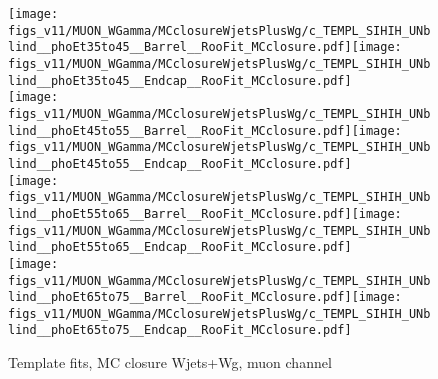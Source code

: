 \begin{figure}[htb]
  \begin{center}
   \texttt{[image: figs\_v11/MUON\_WGamma/MCclosureWjetsPlusWg/c\_TEMPL\_SIHIH\_UNblind\_\_phoEt35to45\_\_Barrel\_\_RooFit\_MCclosure.pdf]}\texttt{[image: figs\_v11/MUON\_WGamma/MCclosureWjetsPlusWg/c\_TEMPL\_SIHIH\_UNblind\_\_phoEt35to45\_\_Endcap\_\_RooFit\_MCclosure.pdf]}\\
   \texttt{[image: figs\_v11/MUON\_WGamma/MCclosureWjetsPlusWg/c\_TEMPL\_SIHIH\_UNblind\_\_phoEt45to55\_\_Barrel\_\_RooFit\_MCclosure.pdf]}\texttt{[image: figs\_v11/MUON\_WGamma/MCclosureWjetsPlusWg/c\_TEMPL\_SIHIH\_UNblind\_\_phoEt45to55\_\_Endcap\_\_RooFit\_MCclosure.pdf]}\\
   \texttt{[image: figs\_v11/MUON\_WGamma/MCclosureWjetsPlusWg/c\_TEMPL\_SIHIH\_UNblind\_\_phoEt55to65\_\_Barrel\_\_RooFit\_MCclosure.pdf]}\texttt{[image: figs\_v11/MUON\_WGamma/MCclosureWjetsPlusWg/c\_TEMPL\_SIHIH\_UNblind\_\_phoEt55to65\_\_Endcap\_\_RooFit\_MCclosure.pdf]}\\
   \texttt{[image: figs\_v11/MUON\_WGamma/MCclosureWjetsPlusWg/c\_TEMPL\_SIHIH\_UNblind\_\_phoEt65to75\_\_Barrel\_\_RooFit\_MCclosure.pdf]}\texttt{[image: figs\_v11/MUON\_WGamma/MCclosureWjetsPlusWg/c\_TEMPL\_SIHIH\_UNblind\_\_phoEt65to75\_\_Endcap\_\_RooFit\_MCclosure.pdf]}\\
  \label{fig:templateFits_MCclosureWjetsPlusWg_SIHIH_MUON_2}
  \caption{Template fits, MC closure Wjets+Wg, muon channel}
  \end{center}
\end{figure}

